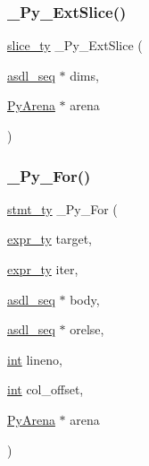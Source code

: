 \subsubsection{\texorpdfstring{\_Py\_ExtSlice()}{\_Py\_ExtSlice()}}
{\footnotesize\ttfamily \mbox{\hyperlink{_python-ast_8h_a1aba5288236679e8faff34c189476bf0}{slice\+\_\+ty}} \+\_\+\+Py\+\_\+\+Ext\+Slice (\begin{DoxyParamCaption}\item[{\mbox{\hyperlink{structasdl__seq}{asdl\+\_\+seq}} $\ast$}]{dims,  }\item[{\mbox{\hyperlink{pyarena_8h_a9edeb357fbb27333471022a0975adb7a}{Py\+Arena}} $\ast$}]{arena }\end{DoxyParamCaption})}

\mbox{\label{_python-ast_8h_a53baf77d5304f3cbae00f4a06e5f1731}} 
\subsubsection{\texorpdfstring{\_Py\_For()}{\_Py\_For()}}
{\footnotesize\ttfamily \mbox{\hyperlink{_python-ast_8h_a39618071027b661bc03e8916e664e1a7}{stmt\+\_\+ty}} \+\_\+\+Py\+\_\+\+For (\begin{DoxyParamCaption}\item[{\mbox{\hyperlink{_python-ast_8h_a56d3705e020a071405094a220c4592bd}{expr\+\_\+ty}}}]{target,  }\item[{\mbox{\hyperlink{_python-ast_8h_a56d3705e020a071405094a220c4592bd}{expr\+\_\+ty}}}]{iter,  }\item[{\mbox{\hyperlink{structasdl__seq}{asdl\+\_\+seq}} $\ast$}]{body,  }\item[{\mbox{\hyperlink{structasdl__seq}{asdl\+\_\+seq}} $\ast$}]{orelse,  }\item[{\mbox{\hyperlink{warnings_8h_a74f207b5aa4ba51c3a2ad59b219a423b}{int}}}]{lineno,  }\item[{\mbox{\hyperlink{warnings_8h_a74f207b5aa4ba51c3a2ad59b219a423b}{int}}}]{col\+\_\+offset,  }\item[{\mbox{\hyperlink{pyarena_8h_a9edeb357fbb27333471022a0975adb7a}{Py\+Arena}} $\ast$}]{arena }\end{DoxyParamCaption})}

\mbox{\label{_python-ast_8h_adf3e1a9736a5443058274bcd750304fb}} 
